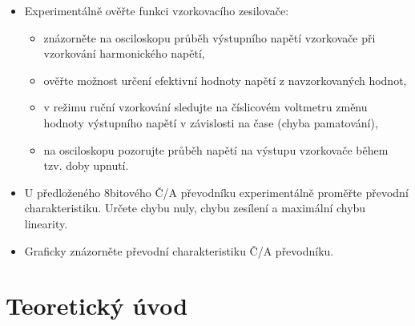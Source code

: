 \documentclass[a4paper, czech]{article}
\begin{document}
\begin{itemize}
    \item Experimentálně ověřte funkci vzorkovacího zesilovače:
    \begin{itemize}
        \item znázorněte na osciloskopu průběh výstupního napětí vzorkovače při vzorkování harmonického napětí,
        \item ověřte možnost určení efektivní hodnoty napětí z navzorkovaných hodnot,
        \item v režimu ruční vzorkování sledujte na číslicovém voltmetru změnu hodnoty výstupního napětí v závislosti na čase (chyba pamatování),
        \item na osciloskopu pozorujte průběh napětí na výstupu vzorkovače během tzv. doby upnutí.
    \end{itemize}
    \item U předloženého 8bitového Č/A převodníku experimentálně proměřte převodní charakteristiku. Určete chybu nuly, chybu zesílení a maximální chybu linearity.
    \item Graficky znázorněte převodní charakteristiku Č/A převodníku.
\end{itemize}

\section{Teoretický úvod}
\end{document}
